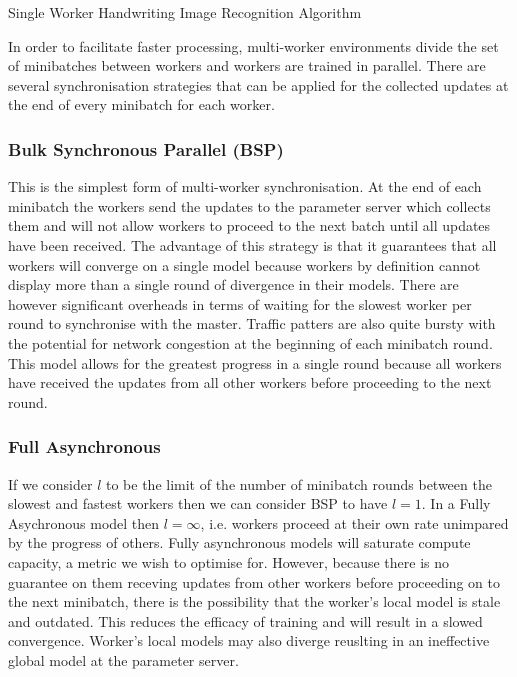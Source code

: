 \documentclass[12pt]{article}
\begin{document}
\IncMargin{1em}
\begin{algorithm}[H]
 \BlankLine

 \caption{Single Worker Handwriting Image Recognition Algorithm}
 \label{SingleWorkerMachineLearningAlgorithm}
\end{algorithm}
\DecMargin{1em}
\medskip
In order to facilitate faster processing, multi-worker environments divide the set of minibatches between workers and workers are trained in parallel. There are several synchronisation strategies that can be applied for the collected updates at the end of every minibatch for each worker.

\subsubsection{Bulk Synchronous Parallel (BSP)}
This is the simplest form of multi-worker synchronisation. At the end of each minibatch the workers send the updates to the parameter server which collects them and will not allow workers to proceed to the next batch until all updates have been received. The advantage of this strategy is that it guarantees that all workers will converge on a single model because workers by definition cannot display more than a single round of divergence in their models. There are however significant overheads in terms of waiting for the slowest worker per round to synchronise with the master. Traffic patters are also quite bursty with the potential for network congestion at the beginning of each minibatch round. This model allows for the greatest progress in a single round because all workers have received the updates from all other workers before proceeding to the next round.

\subsubsection{Full Asynchronous}
If we consider $l$ to be the limit of the number of minibatch rounds between the slowest and fastest workers then we can consider BSP to have $l = 1$. In a Fully Asychronous model then $l = \infty$, i.e. workers proceed at their own rate unimpared by the progress of others. Fully asynchronous models will saturate compute capacity, a metric we wish to optimise for. However, because there is no guarantee on them receving updates from other workers before proceeding on to the next minibatch, there is the possibility that the worker's local model is stale and outdated. This reduces the efficacy of training and will result in a slowed convergence. Worker's local models may also diverge reuslting in an ineffective global model at the parameter server.
\end{document}
